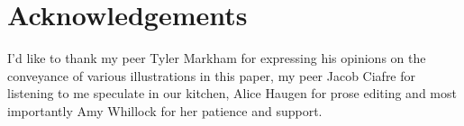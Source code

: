 \documentclass[prbg,preprint]{revtex4-1}
\begin{document}
\section{Acknowledgements}

I'd like to thank my peer Tyler Markham for expressing his opinions on the conveyance of various illustrations in this paper, my peer Jacob Ciafre for listening to me speculate in our kitchen, Alice Haugen for prose editing and most importantly Amy Whillock for her patience and support.






\end{document}
